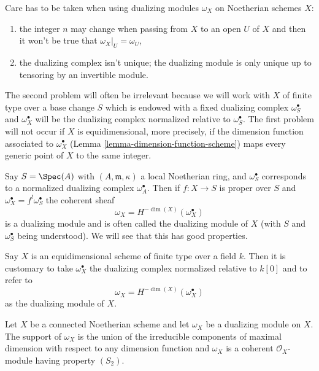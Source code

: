\medskip\noindent
Care has to be taken when using dualizing modules $\omega_X$ on Noetherian
schemes $X$:
\begin{enumerate}
\item the integer $n$ may change when passing from $X$ to an open $U$
of $X$ and then it won't be true that $\omega_X|_U = \omega_U$,
\item the dualizing complex isn't unique; the dualizing module
is only unique up to tensoring by an invertible module.
\end{enumerate}
The second problem will often be irrelevant because we will work
with $X$ of finite type over a base change $S$ which is
endowed with a fixed dualizing complex $\omega_S^\bullet$ and
$\omega_X^\bullet$ will be the dualizing complex normalized relative
to $\omega_S^\bullet$.
The first problem will not occur if $X$ is equidimensional, more precisely,
if the dimension function associated to $\omega_X^\bullet$
(Lemma \ref{lemma-dimension-function-scheme})
maps every generic point of $X$ to the same integer.

\begin{example}
\label{example-proper-over-local}
Say $S = \Spec(A)$ with $(A, \mathfrak m, \kappa)$
a local Noetherian ring, and $\omega_S^\bullet$ corresponds to
a normalized dualizing complex $\omega_A^\bullet$. Then if
$f : X \to S$ is proper over $S$ and $\omega_X^\bullet = f^!\omega_S^\bullet$
the coherent sheaf
$$
\omega_X = H^{-\dim(X)}(\omega_X^\bullet)
$$
is a dualizing module and is often called the dualizing module
of $X$ (with $S$ and $\omega_S^\bullet$ being understood). We will
see that this has good properties.
\end{example}

\begin{example}
\label{example-equidimensional-over-field}
Say $X$ is an equidimensional scheme of finite type
over a field $k$. Then it is customary to take
$\omega_X^\bullet$ the dualizing complex normalized relative to $k[0]$
and to refer to
$$
\omega_X = H^{-\dim(X)}(\omega_X^\bullet)
$$
as the dualizing module of $X$.
\end{example}

\begin{lemma}
\label{lemma-dualizing-module}
Let $X$ be a connected Noetherian scheme and let $\omega_X$ be a dualizing
module on $X$. The support of $\omega_X$ is the union of the irreducible
components of maximal dimension with respect to any dimension function
and $\omega_X$ is a coherent $\mathcal{O}_X$-module having property $(S_2)$.
\end{lemma}

